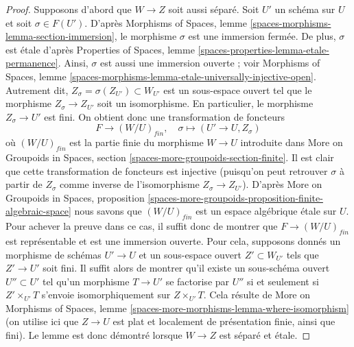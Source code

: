 \begin{proof}
Supposons d'abord que $W \to Z$ soit aussi séparé.
Soit $U'$ un schéma sur $U$ et soit $\sigma \in F(U')$. D'après
Morphisms of Spaces, lemme \ref{spaces-morphisms-lemma-section-immersion},
le morphisme $\sigma$ est une immersion fermée.
De plus, $\sigma$ est étale d'après
Properties of Spaces, lemme \ref{spaces-properties-lemma-etale-permanence}.
Ainsi, $\sigma$ est aussi une immersion ouverte ; voir
Morphisms of Spaces,
lemme \ref{spaces-morphisms-lemma-etale-universally-injective-open}.
Autrement dit, $Z_\sigma = \sigma(Z_{U'}) \subset W_{U'}$ est
un sous-espace ouvert tel que le morphisme $Z_\sigma \to Z_{U'}$
soit un isomorphisme. En particulier, le morphisme $Z_\sigma \to U'$
est fini. On obtient donc une transformation de foncteurs
$$
F \longrightarrow (W/U)_{fin}, \quad
\sigma \longmapsto (U' \to U, Z_\sigma)
$$
où $(W/U)_{fin}$ est la partie finie du morphisme $W \to U$
introduite dans
More on Groupoids in Spaces, section
\ref{spaces-more-groupoids-section-finite}.
Il est clair que cette transformation de foncteurs est injective (puisqu'on peut
retrouver $\sigma$ à partir de $Z_\sigma$ comme inverse de l'isomorphisme
$Z_\sigma \to Z_{U'}$). D'après
More on Groupoids in Spaces, proposition
\ref{spaces-more-groupoids-proposition-finite-algebraic-space}
nous savons que $(W/U)_{fin}$ est un espace algébrique étale sur $U$.
Pour achever la preuve dans ce cas, il suffit donc de montrer que
$F \to (W/U)_{fin}$ est représentable et est une immersion ouverte.
Pour cela, supposons donnés un morphisme de schémas $U' \to U$
et un sous-espace ouvert $Z' \subset W_{U'}$ tels que $Z' \to U'$
soit fini. Il suffit alors de montrer qu'il existe un
sous-schéma ouvert $U'' \subset U'$ tel qu'un morphisme
$T \to U'$ se factorise par $U''$ si et seulement si $Z' \times_{U'} T$
s'envoie isomorphiquement sur $Z \times_{U'} T$. Cela résulte de
More on Morphisms of Spaces, lemme
\ref{spaces-more-morphisms-lemma-where-isomorphism}
(on utilise ici que $Z \to U$ est plat et localement de présentation finie,
ainsi que fini).
Le lemme est donc démontré lorsque $W \to Z$ est séparé
et étale.


\end{proof}
